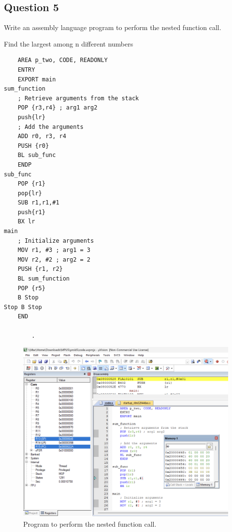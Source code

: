 \documentclass[11pt]{article}
\begin{document}
\subsection{Question 5}
Write an assembly language program to perform the nested function call.
\begin{listing}[h]
    \caption{ Find the largest among n different numbers}
    \begin{verbatim}
    AREA p_two, CODE, READONLY
    ENTRY
    EXPORT main
sum_function  
    ; Retrieve arguments from the stack
    POP {r3,r4} ; arg1 arg2
	push{lr}
    ; Add the arguments
    ADD r0, r3, r4
    PUSH {r0}
    BL sub_func
	ENDP	
sub_func
	POP {r1}
	pop{lr}
	SUB r1,r1,#1
	push{r1}
	BX lr
main
    ; Initialize arguments
    MOV r1, #3 ; arg1 = 3
    MOV r2, #2 ; arg2 = 2
    PUSH {r1, r2} 
    BL sum_function 
    POP {r5} 
    B Stop
Stop B Stop 
	END

        .
\end{verbatim}
\end{listing}

\clearpage
\begin{figure}[!h]
    \centering
    \includegraphics[width=\textwidth]{prob5.png}
    \caption{Program to perform the nested function call.}
\end{figure} 

\newpage


\nocite{*}
\end{document}
